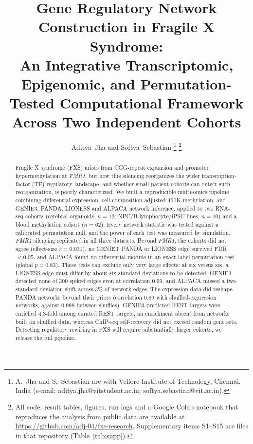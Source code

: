 \documentclass[journal]{IEEEtran}
\newcommand{\gene}[1]{\textit{#1}}
\begin{document}
\title{Gene Regulatory Network Construction in Fragile X Syndrome:\\
An Integrative Transcriptomic, Epigenomic, and Permutation-Tested Computational Framework Across Two Independent Cohorts}

\author{Aditya~Jha and Softya~Sebastian%
\thanks{A.~Jha and S.~Sebastian are with Vellore Institute of Technology, Chennai, India (e-mail: aditya.jha@vitstudent.ac.in; softya.sebastian@vit.ac.in).}%
\thanks{All code, result tables, figures, run logs and a Google Colab notebook that reproduces the analysis from public data are available at \url{https://github.com/adj-04/fxs-research}. Supplementary items S1--S15 are files in that repository (Table~\ref{tab:supp}).}}

\maketitle

\begin{abstract}
Fragile X syndrome (FXS) arises from CGG-repeat expansion and promoter hypermethylation at \gene{FMR1}, but how this silencing reorganizes the wider transcription-factor (TF) regulatory landscape, and whether small patient cohorts can detect such reorganization, is poorly characterized. We built a reproducible multi-omics pipeline combining differential expression, cell-composition-adjusted 450K methylation, and GENIE3, PANDA, LIONESS and ALPACA network inference, applied to two RNA-seq cohorts (cerebral organoids, $n=12$; NPC/B-lymphocyte/iPSC lines, $n=10$) and a blood methylation cohort ($n=62$). Every network statistic was tested against a calibrated permutation null, and the power of each test was measured by simulation. \gene{FMR1} silencing replicated in all three datasets. Beyond \gene{FMR1}, the cohorts did not agree (effect-size $r=0.031$), no GENIE3, PANDA or LIONESS edge survived FDR $<0.05$, and ALPACA found no differential module in an exact label-permutation test (global $p=0.83$). These tests can exclude only very large effects: at six versus six, a LIONESS edge must differ by about six standard deviations to be detected, GENIE3 detected none of 300 spiked edges even at correlation 0.99, and ALPACA missed a two-standard-deviation shift across 3\% of network edges. The expression data did reshape PANDA networks beyond their priors (correlation 0.89 with shuffled-expression networks, against 0.998 between shuffles). GENIE3-predicted REST targets were enriched 4.3-fold among curated REST targets, an enrichment absent from networks built on shuffled data, whereas ChIP-seq self-recovery did not exceed random gene sets. Detecting regulatory rewiring in FXS will require substantially larger cohorts; we release the full pipeline.
\end{abstract}
\end{document}
